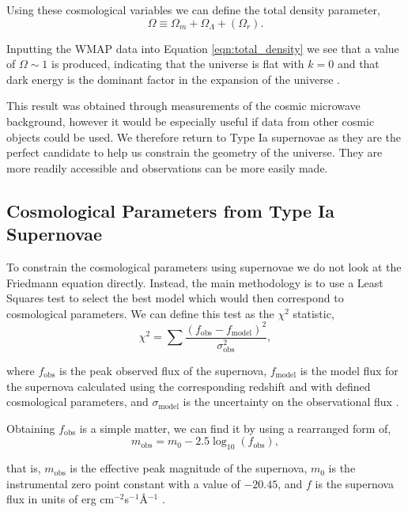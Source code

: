 \documentclass[twocolumn]{revtex4}
\begin{document}
Using these cosmological variables we can define the total density parameter,
\begin{equation}
\Omega \equiv \Omega_m + \Omega_{\Lambda} + (\Omega_{r}).
\label{eqn:total_density}
\end{equation}

Inputting the WMAP data into Equation \ref{eqn:total_density} we see that a value of $\Omega \sim 1$ is produced, indicating that the universe is flat with $k=0$ and that dark energy is the dominant factor in the expansion of the universe \cite{mod_ast}.

This result was obtained through measurements of the cosmic microwave background, however it would be especially useful if data from other cosmic objects could be used. We therefore return to Type Ia supernovae as they are the perfect candidate to help us constrain the geometry of the universe. They are more readily accessible and observations can be more easily made. 

\vspace{-3ex}
\subsection{Cosmological Parameters from Type Ia Supernovae}
\vspace{-2ex}
To constrain the cosmological parameters using supernovae we do not look at the Friedmann equation directly. Instead, the main methodology is to use a Least Squares test to select the best model which would then correspond to cosmological parameters. We can define this test as the $\chi^2$ statistic, 
\begin{equation}
\chi^2 = \sum \frac{(f_\text{obs}-f_\text{model})^2}{\sigma_\text{obs}^2},
\label{eqn:chi_eqn}
\end{equation}

where $f_\text{obs}$ is the peak observed flux of the supernova, $f_\text{model}$ is the model flux for the supernova calculated using the corresponding redshift and with defined cosmological parameters, and $\sigma_\text{model}$ is the uncertainty on the observational flux \cite{script}.

Obtaining $f_\text{obs}$ is a simple matter, we can find it by using a rearranged form of,
\begin{equation}
m_\text{obs}=m_0 - 2.5\log_{10}(f_\text{obs}),
\label{eqn:mag_flux}
\end{equation}

that is, $m_\text{obs}$ is the effective peak magnitude of the supernova, $m_0$ is the instrumental zero point constant with a value of $-20.45$, and $f$ is the supernova flux in units of erg cm$^{-2}$s$^{-1}$\AA$^{-1}$ \cite{script}.
\end{document}
